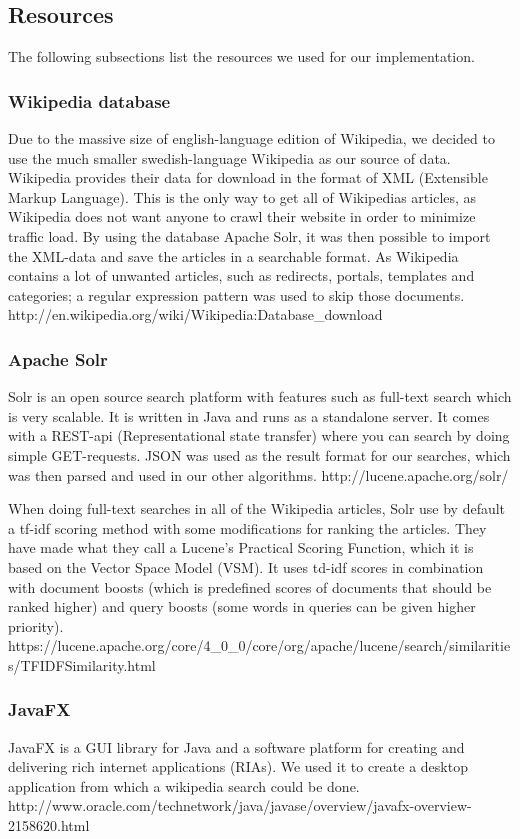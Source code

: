 \documentclass[10pt, a4paper]{article}
\begin{document}
\subsection{Resources}
The following subsections list the resources we used for our implementation.
\subsubsection{Wikipedia database}
Due to the massive size of english-language edition of Wikipedia, we decided to use the much smaller swedish-language Wikipedia as our source of data. Wikipedia provides their data for download in the format of XML (Extensible Markup Language). This is the only way to get all of Wikipedias articles, as Wikipedia does not want anyone to crawl their website in order to minimize traffic load. By using the database Apache Solr, it was then possible to import the XML-data and save the articles in a searchable format. As Wikipedia contains a lot of unwanted articles, such as redirects, portals, templates and categories; a regular expression pattern was used to skip those documents. http://en.wikipedia.org/wiki/Wikipedia:Database_download

\subsubsection{Apache Solr}
Solr is an open source search platform with features such as full-text search which is very scalable. It is written in Java and runs as a standalone server. It comes with a REST-api (Representational state transfer) where you can search by doing simple GET-requests. JSON was used as the result format for our searches, which was then parsed and used in our other algorithms.
http://lucene.apache.org/solr/

When doing full-text searches in all of the Wikipedia articles, Solr use by default a tf-idf scoring method with some modifications for ranking the articles. They have made what they call a Lucene's Practical Scoring Function, which it is based on the Vector Space Model (VSM). It uses td-idf scores in combination with document boosts (which is predefined scores of documents that should be ranked higher) and query boosts (some words in queries can be given higher priority).
https://lucene.apache.org/core/4_0_0/core/org/apache/lucene/search/similarities/TFIDFSimilarity.html

\subsubsection{JavaFX}
JavaFX is a GUI library for Java and a software platform for creating and delivering rich internet applications (RIAs). We used it to create a desktop application from which a wikipedia search could be done.
http://www.oracle.com/technetwork/java/javase/overview/javafx-overview-2158620.html
\end{document}
